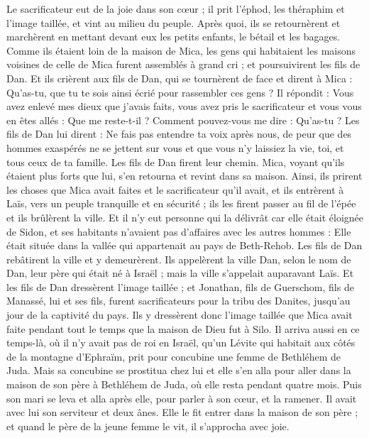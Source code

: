 \begin{multicols}{2}
Le sacrificateur eut de la joie dans son cœur ; il prit l'éphod, les théraphim et l'image taillée, et vint au milieu du peuple.
Après quoi, ils se retournèrent et marchèrent en mettant devant eux les petits enfants, le bétail et les bagages.
Comme ils étaient loin de la maison de Mica, les gens qui habitaient les maisons voisines de celle de Mica furent assemblés à grand cri ; et poursuivirent les fils de Dan.
Et ils crièrent aux fils de Dan, qui se tournèrent de face et dirent à Mica : Qu'as-tu, que tu te sois ainsi écrié pour rassembler ces gens ?
Il répondit : Vous avez enlevé mes dieux que j'avais faits, vous avez pris le sacrificateur et vous vous en êtes allés : Que me reste-t-il ? Comment pouvez-vous me dire : Qu'as-tu ?
Les fils de Dan lui dirent : Ne fais pas entendre ta voix après nous, de peur que des hommes exaspérés ne se jettent sur vous et que vous n'y laissiez la vie, toi, et tous ceux de ta famille.
Les fils de Dan firent leur chemin. Mica, voyant qu'ils étaient plus forts que lui, s'en retourna et revint dans sa maison.
Ainsi, ils prirent les choses que Mica avait faites et le sacrificateur qu'il avait, et ils entrèrent à Laïs, vers un peuple tranquille et en sécurité ; ils les firent passer au fil de l'épée et ils brûlèrent la ville.
Et il n'y eut personne qui la délivrât car elle était éloignée de Sidon, et ses habitants n'avaient pas d'affaires avec les autres hommes : Elle était située dans la vallée qui appartenait au pays de Beth-Rehob. Les fils de Dan rebâtirent la ville et y demeurèrent.
Ils appelèrent la ville Dan, selon le nom de Dan, leur père qui était né à Israël ; mais la ville s'appelait auparavant Laïs.
Et les fils de Dan dressèrent l'image taillée ; et Jonathan, fils de Guerschom, fils de Manassé, lui et ses fils, furent sacrificateurs pour la tribu des Danites, jusqu'au jour de la captivité du pays.
Ils y dressèrent donc l'image taillée que Mica avait faite pendant tout le temps que la maison de Dieu fut à Silo.
\VerseOne{}Il arriva aussi en ce temps-là, où il n'y avait pas de roi en Israël, qu'un Lévite qui habitait aux côtés de la montagne d'Ephraïm, prit pour concubine une femme de Bethléhem de Juda.
Mais sa concubine se prostitua chez lui et elle s'en alla pour aller dans la maison de son père à Bethléhem de Juda, où elle resta pendant quatre mois.
Puis son mari se leva et alla après elle, pour parler à son cœur, et la ramener. Il avait avec lui son serviteur et deux ânes. Elle le fit entrer dans la maison de son père ; et quand le père de la jeune femme le vit, il s'approcha avec joie.

\end{multicols}
